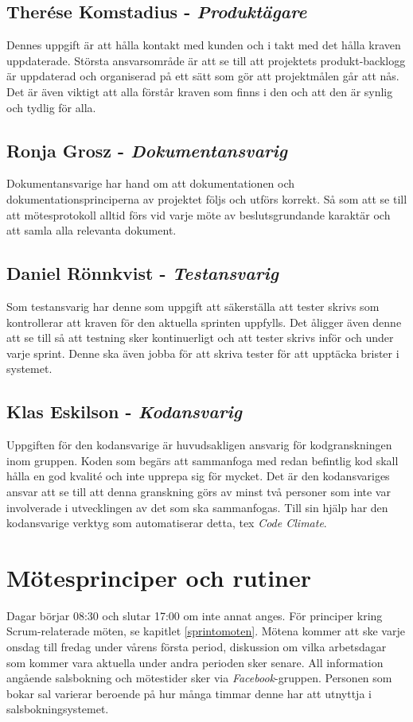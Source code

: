 \documentclass[a4paper,12pt,oneside,final]{extbook}
\begin{document}
  \subsection{Therése Komstadius - \emph{Produktägare}}
  Dennes uppgift är att hålla kontakt med kunden och i takt med
  det hålla kraven uppdaterade. Största ansvarsområde är att se
  till att projektets produkt-backlogg är uppdaterad och organiserad
  på ett sätt som gör att projektmålen går att nås. Det är även
  viktigt att alla förstår kraven som finns i den och att den är
  synlig och tydlig för alla.

  \subsection{Ronja Grosz  - \emph{Dokumentansvarig}}
  Dokumentansvarige har hand om att dokumentationen och
  dokumentationsprinciperna av projektet följs och utförs korrekt.
  Så som att se till att mötesprotokoll alltid förs vid varje möte
  av beslutsgrundande karaktär och att samla alla relevanta dokument.

  \subsection{Daniel Rönnkvist - \emph{Testansvarig}}
  Som testansvarig har denne som uppgift att säkerställa att tester
  skrivs som kontrollerar att kraven för den aktuella sprinten uppfylls.
  Det åligger även denne att se till så att testning sker
  kontinuerligt och att tester skrivs inför och under varje sprint.
  Denne ska även jobba för att skriva tester för att upptäcka brister
  i systemet.

  \subsection{Klas Eskilson  - \emph{Kodansvarig}}
  Uppgiften för den kodansvarige är huvudsakligen ansvarig för
  kodgranskningen inom gruppen. Koden som begärs att sammanfoga med
  redan befintlig kod skall hålla en god kvalité och inte upprepa
  sig för mycket. Det är den kodansvariges ansvar att se till att
  denna granskning görs av minst två personer som inte var involverade
  i utvecklingen av det som ska sammanfogas. Till sin hjälp har den
  kodansvarige verktyg som automatiserar detta, tex \emph{Code Climate}.

  \section{Mötesprinciper och rutiner}
  Dagar börjar 08:30 och slutar 17:00 om inte annat anges. För
  principer kring Scrum-relaterade möten, se kapitlet \ref{sprintomoten}.
  Mötena kommer att ske varje onsdag till fredag under vårens första period,
  diskussion om vilka arbetsdagar som kommer vara aktuella under andra
  perioden sker senare. All information angående salsbokning och mötestider
  sker via \emph{Facebook}-gruppen. Personen som bokar sal varierar beroende på hur
  många timmar denne har att utnyttja i salsbokningsystemet.
\end{document}
